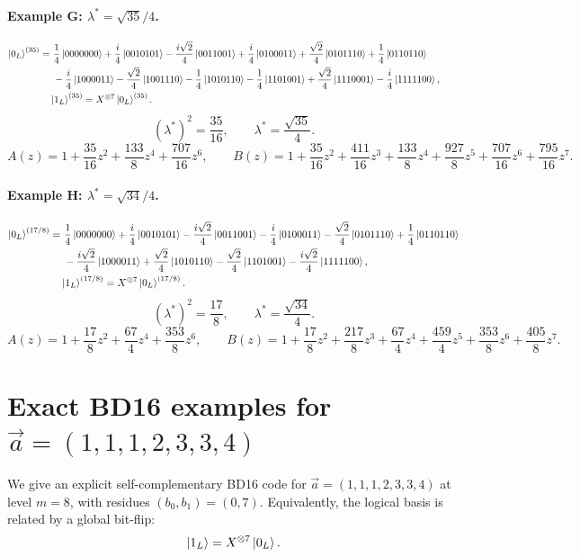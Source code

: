 \documentclass[11pt]{article}
\begin{document}
\paragraph{Example G: \texorpdfstring{$\lambda^\ast=\sqrt{35}/4$}{lambda*=sqrt35/4}.}
\[
\begin{aligned}
\ket{0_L}^{(35)}=
&\ \frac{1}{4}\ket{0000000}
+\frac{i}{4}\ket{0010101}
-\frac{i\sqrt2}{4}\ket{0011001}
+\frac{i}{4}\ket{0100011}
+\frac{\sqrt2}{4}\ket{0101110}
+\frac{1}{4}\ket{0110110}\\
&\ -\frac{i}{4}\ket{1000011}
-\frac{\sqrt2}{4}\ket{1001110}
-\frac{1}{4}\ket{1010110}
-\frac{1}{4}\ket{1101001}
+\frac{\sqrt2}{4}\ket{1110001}
-\frac{i}{4}\ket{1111100},\qquad\\
&\ket{1_L}^{(35)}=X^{\otimes 7}\ket{0_L}^{(35)}.
\end{aligned}
\]
\[
\boxed{(\lambda^\ast)^2=\frac{35}{16},\qquad \lambda^\ast=\frac{\sqrt{35}}{4}.}
\]
\[
A(z)=1+\frac{35}{16}z^2+\frac{133}{8}z^4+\frac{707}{16}z^6,\qquad
B(z)=1+\frac{35}{16}z^2+\frac{411}{16}z^3+\frac{133}{8}z^4+\frac{927}{8}z^5+\frac{707}{16}z^6+\frac{795}{16}z^7.
\]

\paragraph{Example H: \texorpdfstring{$\lambda^\ast=\sqrt{34}/4$}{lambda*=sqrt34/4}.}
\[
\begin{aligned}
\ket{0_L}^{(17/8)}=
&\ \frac{1}{4}\ket{0000000}
+\frac{i}{4}\ket{0010101}
-\frac{i\sqrt2}{4}\ket{0011001}
-\frac{i}{4}\ket{0100011}
-\frac{\sqrt2}{4}\ket{0101110}
+\frac{1}{4}\ket{0110110}\\
&\ -\frac{i\sqrt2}{4}\ket{1000011}
+\frac{\sqrt2}{4}\ket{1010110}
-\frac{\sqrt2}{4}\ket{1101001}
-\frac{i\sqrt2}{4}\ket{1111100},\qquad\\
&\ket{1_L}^{(17/8)}=X^{\otimes 7}\ket{0_L}^{(17/8)}.
\end{aligned}
\]
\[
\boxed{(\lambda^\ast)^2=\frac{17}{8},\qquad \lambda^\ast=\frac{\sqrt{34}}{4}.}
\]
\[
A(z)=1+\frac{17}{8}z^2+\frac{67}{4}z^4+\frac{353}{8}z^6,\qquad
B(z)=1+\frac{17}{8}z^2+\frac{217}{8}z^3+\frac{67}{4}z^4+\frac{459}{4}z^5+\frac{353}{8}z^6+\frac{405}{8}z^7.
\]

\section{Exact BD16 examples for \texorpdfstring{$\vec a=(1,1,1,2,3,3,4)$}{a=(1,1,1,2,3,3,4)}}

We give an explicit self-complementary BD16 code for
\(\vec a=(1,1,1,2,3,3,4)\) at level \(m=8\), with residues \((b_0,b_1)=(0,7)\).
Equivalently, the logical basis is related by a global bit-flip:
\[
\ket{1_L} = X^{\otimes 7}\ket{0_L}.
\]
\end{document}
